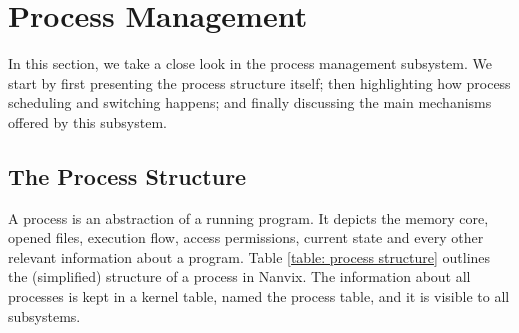 \documentclass[10pt,a4paper]{article}
\begin{document}
\section{Process Management}

In this section, we take a close look in the process management subsystem. We start by first presenting the process structure itself; then highlighting how process scheduling and switching happens; and finally discussing the main mechanisms offered by this subsystem.

\subsection{The Process Structure}

A process is an abstraction of a running program. It depicts the memory core, opened files, execution flow, access permissions, current state and every other relevant information about a program. Table \ref{table: process structure} outlines the (simplified) structure of a process in Nanvix. The information about all processes is kept in a kernel table, named the process table, and it is visible to all subsystems.
\end{document}
